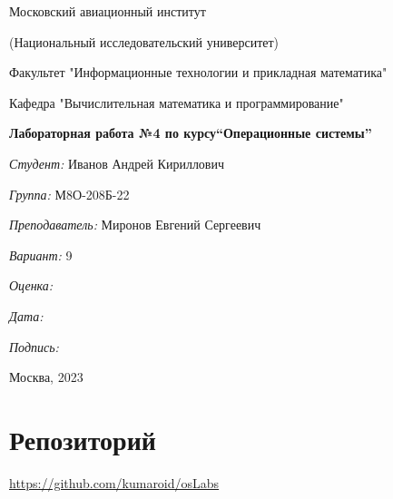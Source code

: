 \documentclass[a4paper, 12pt]{article}
\begin{document}
\thispagestyle{empty}	
\begin{center}
	Московский авиационный институт
	
	(Национальный исследовательский университет)
	
	Факультет "Информационные технологии и прикладная математика"
	
	Кафедра "Вычислительная математика и программирование"
	
\end{center}
\vspace{40ex}
\begin{center}
	\textbf{\large{Лабораторная работа №4 по курсу\linebreak \textquotedblleft Операционные системы\textquotedblright}}
\end{center}
\vspace{35ex}
\begin{flushright}
	\textit{Студент: } Иванов Андрей Кириллович
	
	\vspace{2ex}
	\textit{Группа: } М8О-208Б-22
	
	\vspace{2ex}
	\textit{Преподаватель: } Миронов Евгений Сергеевич
	
	\vspace{2ex}
	\textit{Вариант: } 9
	
	\vspace{2ex}
	\textit{Оценка: } \underline{\quad\quad\quad\quad\quad\quad}
	
	 \vspace{2ex}
	\textit{Дата: } \underline{\quad\quad\quad\quad\quad\quad}
	
	\vspace{2ex}
	\textit{Подпись: } \underline{\quad\quad\quad\quad\quad\quad}
	
\end{flushright}

\vspace{5ex}

\begin{vfill}
	\begin{center}
		Москва, 2023
	\end{center}	
\end{vfill}
\newpage

\begingroup
\color{black}
\tableofcontents\newpage
\endgroup

\section{Репозиторий}
\href{https://github.com/kumaroid/osLabs}{https://github.com/kumaroid/osLabs}
\end{document}
